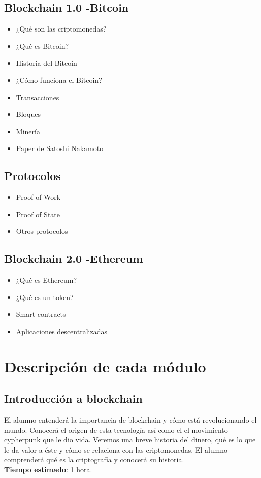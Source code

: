 \documentclass[a4paper,12pt]{lib/pub}
\begin{document}
\subsection{Blockchain 1.0 -Bitcoin}
\begin{itemize}
	\item ¿Qué son las criptomonedas?
	\item ¿Qué es Bitcoin?
	\item Historia del Bitcoin
	\item ¿Cómo funciona el Bitcoin?
	\item Transacciones
	\item Bloques
	\item Minería
	\item Paper de Satoshi Nakamoto
\end{itemize}
\subsection{Protocolos}
\begin{itemize}
	\item Proof of Work
	\item Proof of State
	\item Otros protocolos
\end{itemize}
\subsection{Blockchain 2.0 -Ethereum}
\begin{itemize}
	\item ¿Qué es Ethereum?
	\item ¿Qué es un token?
	\item Smart contracts
	\item Aplicaciones descentralizadas
\end{itemize}

\newpage
\section{Descripción de cada módulo}

\subsection{Introducción a blockchain}
El alumno entenderá la importancia de blockchain y cómo está revolucionando el mundo. Conocerá el origen de esta tecnología así como el el movimiento cypherpunk que le dio vida. Veremos una breve historia del dinero, qué es lo que le da valor a éste y cómo se relaciona con las criptomonedas. El alumno comprenderá qué es la criptografía y conocerá su historia.\\\textbf{Tiempo estimado}: 1 hora.
\end{document}
